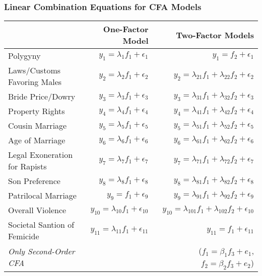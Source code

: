 \documentclass{beamer}
\begin{document}
\begin{frame}
\frametitle{Linear Combination Equations for CFA Models}
\begin{table}[htb]
\tiny
    \centering
    \begin{tabular}{l|r|r}
      &  One-Factor Model & Two-Factor Models \\
     \hline
    Polygyny & $y_1 = \lambda_1 f_1 + \epsilon_1$ & $y_1 = f_2 + \epsilon_1$  \\
    Laws/Customs Favoring Males & $y_2 = \lambda_2 f_1 + \epsilon_2$ &  $y_2 = \lambda_{21} f_1 + \lambda_{22} f_2 + \epsilon_2$  \\
    Bride Price/Dowry & $y_3 = \lambda_3 f_1 + \epsilon_3$ & $y_3 = \lambda_{31} f_1 + \lambda_{32} f_2 + \epsilon_3$  \\
    Property Rights & $y_4 = \lambda_4 f_1 + \epsilon_4$ & $y_4 = \lambda_{41} f_1 + \lambda_{42} f_2 + \epsilon_4$  \\    
    Cousin Marriage & $y_5 = \lambda_5 f_1 + \epsilon_5$ & $y_5 = \lambda_{51} f_1 + \lambda_{52} f_2 + \epsilon_5$  \\
    Age of Marriage & $y_6 = \lambda_6 f_1 + \epsilon_6$ & $y_6 = \lambda_{61} f_1 + \lambda_{62} f_2 + \epsilon_6$  \\
    Legal Exoneration for Rapists & $y_7 = \lambda_7 f_1 + \epsilon_7$ & $y_7 = \lambda_{71} f_1 + \lambda_{72} f_2 + \epsilon_7$   \\
    Son Preference & $y_8 = \lambda_8 f_1 + \epsilon_8$ & $y_8 = \lambda_{81} f_1 + \lambda_{82} f_2 + \epsilon_8$  \\
    Patrilocal Marriage & $y_9 = f_1 + \epsilon_9$ & $y_9 = \lambda_{91} f_1 + \lambda_{92} f_2 + \epsilon_9$   \\
    Overall Violence & $y_{10} = \lambda_{10} f_1 + \epsilon_{10}$ & $y_{10} = \lambda_{101} f_1 + \lambda_{102} f_2 + \epsilon_{10}$   \\
    Societal Santion of Femicide & $y_{11} = \lambda_{11} f_1 + \epsilon_{11}$ & $y_{11} = f_1 + \epsilon_{11}$  \\
    \hline
    \emph{Only Second-Order CFA} & & ($f_1 = \beta_1 f_3 + e_1$, $f_2 = \beta_2 f_3 + e_2$) \\
    \end{tabular}
    \label{diagSyn}
\end{table}
\end{frame}
\end{document}
